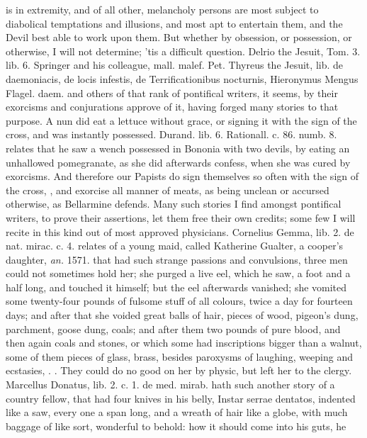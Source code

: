 {{is in extremity, and of all other, melancholy persons are most subject
to diabolical temptations and illusions, and most apt to entertain
them, and the Devil best able to work upon them. But whether by
obsession, or possession, or otherwise, I will not determine; 'tis a
difficult question. Delrio the Jesuit, Tom. 3. lib. 6. Springer and his
colleague, mall. malef. Pet. Thyreus the Jesuit, \textlatin{lib. de daemoniacis,
de locis infestis, de Terrificationibus nocturnis, Hieronymus Mengus
Flagel. daem.} and others of that rank of pontifical writers, it seems,
by their exorcisms and conjurations approve of it, having forged many
stories to that purpose. A nun did eat a lettuce without grace,
or signing it with the sign of the cross, and was instantly possessed.
Durand. lib. 6. Rationall. c. 86. numb. 8. relates that he saw a wench
possessed in Bononia with two devils, by eating an unhallowed
pomegranate, as she did afterwards confess, when she was cured by
exorcisms. And therefore our Papists do sign themselves so often with
the sign of the cross, , and exorcise all manner
of meats, as being unclean or accursed otherwise, as Bellarmine
defends. Many such stories I find amongst pontifical writers, to prove
their assertions, let them free their own credits; some few I will
recite in this kind out of most approved physicians. Cornelius Gemma,
lib. 2. de nat. mirac. c. 4. relates of a young maid, called Katherine
Gualter, a cooper's daughter, \emph{an.} 1571. that had such strange
passions and convulsions, three men could not sometimes hold her; she
purged a live eel, which he saw, a foot and a half long, and touched it
himself; but the eel afterwards vanished; she vomited some twenty-four
pounds of fulsome stuff of all colours, twice a day for fourteen days;
and after that she voided great balls of hair, pieces of wood, pigeon's
dung, parchment, goose dung, coals; and after them two pounds of pure
blood, and then again coals and stones, or which some had inscriptions
bigger than a walnut, some of them pieces of glass, brass, \etc{} besides
paroxysms of laughing, weeping and ecstasies, \etc{}. . They could do no good on her by
physic, but left her to the clergy. Marcellus Donatus, lib. 2. c. 1. de
med. mirab. hath such another story of a country fellow, that had four
knives in his belly, Instar serrae dentatos, indented like a saw, every
one a span long, and a wreath of hair like a globe, with much baggage
of like sort, wonderful to behold: how it should come into his guts, he
}}
